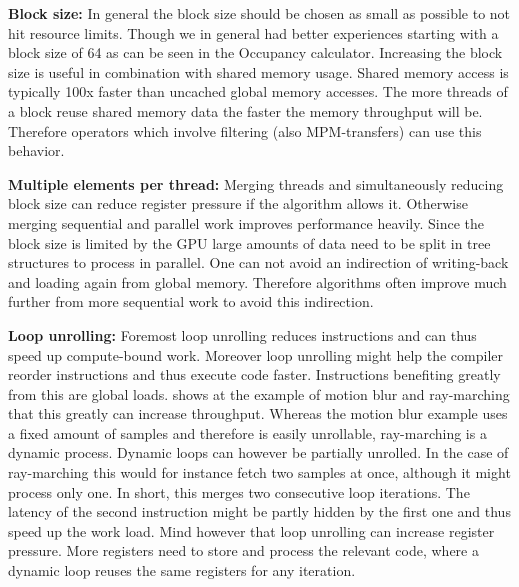 \documentclass[m,times]{cgMA}
\begin{document}
\textbf{Block size:} In general the block size should be chosen as small as possible to not hit resource limits. Though we in general had better experiences starting with a block size of 64 as can be seen in the Occupancy calculator. Increasing the block size is useful in combination with shared memory usage. Shared memory access is typically 100x faster than uncached global memory accesses. The more threads of a block reuse shared memory data the faster the memory throughput will be. Therefore operators which involve filtering (also MPM-transfers) can use this behavior.

\textbf{Multiple elements per thread:} Merging threads and simultaneously reducing block size can reduce register pressure if the algorithm allows it. Otherwise merging sequential and parallel work improves performance heavily. Since the block size is limited by the GPU large amounts of data need to be split in tree structures to process in parallel. One can not avoid an indirection of writing-back and loading again from global memory. Therefore algorithms often improve much further from more sequential work to avoid this indirection.

\textbf{Loop unrolling:} Foremost loop unrolling reduces instructions and can thus speed up compute-bound work. Moreover loop unrolling might help the compiler reorder instructions and thus execute code faster. Instructions benefiting greatly from this are global loads. \cite{NVIDIA:PEAK_PERFORMANCE} shows at the example of motion blur and ray-marching that this greatly can increase throughput. Whereas the motion blur example uses a fixed amount of samples and therefore is easily unrollable, ray-marching is a dynamic process. Dynamic loops can however be partially unrolled. In the case of ray-marching this would for instance fetch two samples at once, although it might process only one. In short, this merges two consecutive loop iterations. The latency of the second instruction might be partly hidden by the first one and thus speed up the work load. Mind however that loop unrolling can increase register pressure. More registers need to store and process the relevant code, where a dynamic loop reuses the same registers for any iteration.

\begin{flushright}\cite{AMD:GPU_OPEN}\cite{NVIDIA:BEST:PRACTICE}\cite{NVIDIA:PEAK_PERFORMANCE}\end{flushright}
\end{document}
